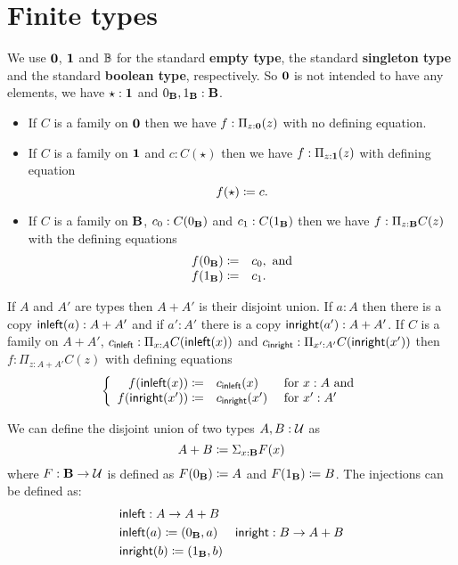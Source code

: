 {\section{Finite types}
\label{sec:finite-types}

We use ${\bf 0}$, ${\bf 1}$ and $\mathbb{B}$ for the standard {\bf empty
  type}, the standard {\bf singleton type} and the standard {\bf
  boolean type}, respectively.  So ${\bf 0}$ is not intended to have
any elements, we have $\star:{\bf 1}$ and $0_{\bf B},1_{\bf B}:{\bf B}$.
\begin{itemize}
\item If $C$ is a family on ${\bf 0}$ then we have $f:\Pi_{z:{\bf 0}}(z)$ with no defining equation.
\item If $C$ is a family on ${\bf 1}$ and $c:C(\star)$ then we have $f:\Pi_{z:{\bf 1}}(z)$ with defining equation
  \[ f(\star)\coloneqq c.\]
\item If $C$ is a family on ${\bf B}$, $c_0:C(0_{\bf B})$ 
and $c_1:C(1_{\bf B})$ then we have $f:\Pi_{z:{\bf B}}C(z)$ with the defining equations
 \[ \begin{array}{rl}
f(0_{\bf B}) \coloneqq& c_0, \mbox{ and}\\
f(1_{\bf B}) \coloneqq& c_1.
  \end{array}\]
\end{itemize}

If $A$ and $A'$ are types then $A+A'$ is their disjoint union.  If
$a:A$ then there is a copy ${\sf inleft}(a):A+A'$ and if $a':A'$ there is a
copy ${\sf inright}(a'):A+A'$.
If $C$ is a family on $A+A'$, $c_{\sf inleft}:\Pi_{x:A}C({\sf inleft}(x))$ and $c_{\sf inright}:\Pi_{x':A'}C({\sf inright}(x'))$ then $f:\Pi_{z:A+A'}C(z)$ with defining equations
  \[\left\{\begin{array}{rll} 
f({\sf inleft}(x))\coloneqq& c_{\sf inleft}(x)&\mbox{ for } x:A \mbox{ and}\\
f({\sf inright}(x'))\coloneqq& c_{\sf inright}(x')&\mbox{ for } x':A'\\
\end{array}\right.\]

We can define the disjoint union of two types $A,B:{\mathcal U}$ as
\[A + B \coloneqq \Sigma_{x:{\bf B}}F(x)\]
where $F : {\bf B} \to {\mathcal U}$ is
defined as $F(0_{\bf B}) \coloneqq A$ and $F(1_{\bf B})\coloneqq B$. The
injections can be defined as:
\begin{align*}
& {\sf inleft} :  A \to A+B\\
& {\sf inleft}(a) \coloneqq (0_{\bf B},a)
& {\sf inright} :  B \to A+B\\
& {\sf inright}(b) \coloneqq (1_{\bf B},b)
\end{align*}

}
